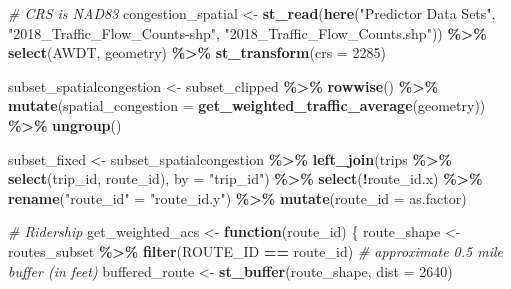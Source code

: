 \documentclass[
  12pt,
]{article}
\newenvironment{Shaded}{\begin{snugshade}}{\end{snugshade}}
\newcommand{\AttributeTok}[1]{\textcolor[rgb]{0.13,0.29,0.53}{#1}}
\newcommand{\CommentTok}[1]{\textcolor[rgb]{0.56,0.35,0.01}{\textit{#1}}}
\newcommand{\ControlFlowTok}[1]{\textcolor[rgb]{0.13,0.29,0.53}{\textbf{#1}}}
\newcommand{\DecValTok}[1]{\textcolor[rgb]{0.00,0.00,0.81}{#1}}
\newcommand{\FunctionTok}[1]{\textcolor[rgb]{0.13,0.29,0.53}{\textbf{#1}}}
\newcommand{\NormalTok}[1]{#1}
\newcommand{\OtherTok}[1]{\textcolor[rgb]{0.56,0.35,0.01}{#1}}
\newcommand{\SpecialCharTok}[1]{\textcolor[rgb]{0.81,0.36,0.00}{\textbf{#1}}}
\newcommand{\StringTok}[1]{\textcolor[rgb]{0.31,0.60,0.02}{#1}}
\begin{document}
\begin{Shaded}
\begin{Highlighting}[]
\CommentTok{\# CRS is NAD83}
\NormalTok{congestion\_spatial }\OtherTok{\textless{}{-}} \FunctionTok{st\_read}\NormalTok{(}\FunctionTok{here}\NormalTok{(}\StringTok{"Predictor Data Sets"}\NormalTok{,}
                                   \StringTok{"2018\_Traffic\_Flow\_Counts{-}shp"}\NormalTok{,}
                                   \StringTok{"2018\_Traffic\_Flow\_Counts.shp"}\NormalTok{)) }\SpecialCharTok{\%\textgreater{}\%}
  \FunctionTok{select}\NormalTok{(AWDT, geometry) }\SpecialCharTok{\%\textgreater{}\%}
  \FunctionTok{st\_transform}\NormalTok{(}\AttributeTok{crs =} \DecValTok{2285}\NormalTok{)}

\NormalTok{subset\_spatialcongestion }\OtherTok{\textless{}{-}}\NormalTok{ subset\_clipped }\SpecialCharTok{\%\textgreater{}\%} 
  \FunctionTok{rowwise}\NormalTok{() }\SpecialCharTok{\%\textgreater{}\%} 
  \FunctionTok{mutate}\NormalTok{(}\AttributeTok{spatial\_congestion =} \FunctionTok{get\_weighted\_traffic\_average}\NormalTok{(geometry)) }\SpecialCharTok{\%\textgreater{}\%}
  \FunctionTok{ungroup}\NormalTok{()}

\NormalTok{subset\_fixed }\OtherTok{\textless{}{-}}\NormalTok{ subset\_spatialcongestion }\SpecialCharTok{\%\textgreater{}\%}
  \FunctionTok{left\_join}\NormalTok{(trips }\SpecialCharTok{\%\textgreater{}\%} \FunctionTok{select}\NormalTok{(trip\_id, route\_id),}
            \AttributeTok{by =} \StringTok{"trip\_id"}\NormalTok{) }\SpecialCharTok{\%\textgreater{}\%}
  \FunctionTok{select}\NormalTok{(}\SpecialCharTok{!}\NormalTok{route\_id.x) }\SpecialCharTok{\%\textgreater{}\%}
  \FunctionTok{rename}\NormalTok{(}\StringTok{"route\_id"} \OtherTok{=} \StringTok{"route\_id.y"}\NormalTok{) }\SpecialCharTok{\%\textgreater{}\%}
  \FunctionTok{mutate}\NormalTok{(}\AttributeTok{route\_id =}\NormalTok{ as.factor)}

\CommentTok{\# Ridership}
\NormalTok{get\_weighted\_acs }\OtherTok{\textless{}{-}} \ControlFlowTok{function}\NormalTok{(route\_id) \{}
\NormalTok{   route\_shape }\OtherTok{\textless{}{-}}\NormalTok{ routes\_subset }\SpecialCharTok{\%\textgreater{}\%}
     \FunctionTok{filter}\NormalTok{(ROUTE\_ID }\SpecialCharTok{==}\NormalTok{ route\_id)}
  \CommentTok{\# approximate 0.5 mile buffer (in feet)}
\NormalTok{  buffered\_route }\OtherTok{\textless{}{-}} \FunctionTok{st\_buffer}\NormalTok{(route\_shape, }\AttributeTok{dist =} \DecValTok{2640}\NormalTok{) }
  

\end{Highlighting}
\end{Shaded}
\end{document}
